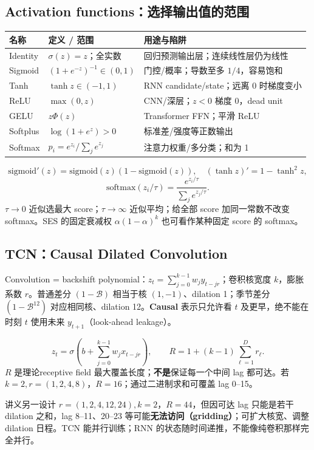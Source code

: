 \documentclass[UTF8,fontset=fandol,10.5pt,a4paper]{ctexart}
\newcommand{\eng}[1]{{\sffamily\color{navy}#1}}
\newcommand{\thick}{\renewcommand{\arraystretch}{1.18}}
\begin{document}
\subsection{Activation functions：选择输出值的范围}
\begin{center}\small\thick\begin{tabularx}{0.99\linewidth}{lXX}
\toprule
名称 & 定义 / 范围 & 用途与陷阱\\\midrule
Identity & $\sigma(z)=z$；全实数 & 回归预测输出层；连续线性层仍为线性 \\
Sigmoid & $(1+e^{-z})^{-1}\in(0,1)$ & 门控/概率；导数至多 $1/4$，容易饱和 \\
Tanh & $\tanh z\in(-1,1)$ & RNN candidate/state；远离 0 时梯度变小 \\
ReLU & $\max(0,z)$ & CNN/深层；$z<0$ 梯度 0，dead unit \\
GELU & $z\Phi(z)$ & Transformer FFN；平滑 ReLU \\
Softplus & $\log(1+e^z)>0$ & 标准差/强度等正数输出 \\
Softmax & $p_i=e^{z_i}/\sum_j e^{z_j}$ & 注意力权重/多分类；和为 1 \\
\bottomrule\end{tabularx}\end{center}
\begin{keybox}
\[\mathrm{sigmoid}'(z)=\mathrm{sigmoid}(z)(1-\mathrm{sigmoid}(z)),\quad (\tanh z)'=1-\tanh^2z,\]
\[\mathrm{softmax}(z_i/\tau)=\frac{e^{z_i/\tau}}{\sum_je^{z_j/\tau}}.\]
$\tau\to0$ 近似选最大 score；$\tau\to\infty$ 近似平均；给全部 score 加同一常数不改变 softmax。SES 的固定衰减权 $\alpha(1-\alpha)^k$ 也可看作某种固定 score 的 softmax。
\end{keybox}
\subsection{TCN：Causal Dilated Convolution}
\eng{Convolution = backshift polynomial}：$z_t=\sum_{j=0}^{k-1}w_jy_{t-jr}$；卷积核宽度 $k$，膨胀系数 $r$。普通差分 $(1-\mathcal B)$ 相当于核 $(1,-1)$、dilation 1；季节差分 $(1-\mathcal B^{12})$ 对应相同核、dilation 12。\textbf{Causal} 表示只允许看 $t$ 及更早，绝不能在时刻 $t$ 使用未来 $y_{t+1}$（\eng{look-ahead leakage}）。
\begin{keybox}
\[z_t=\sigma\left(b+\sum_{j=0}^{k-1}w_jx_{t-jr}\right),\qquad R=1+(k-1)\sum_{\ell=1}^{D}r_\ell.\]
$R$ 是理论\eng{receptive field} 最大覆盖长度；\textbf{不是}保证每一个中间 lag 都可达。若 $k=2,r=(1,2,4,8)$，$R=16$；通过二进制求和可覆盖 lag 0--15。
\end{keybox}
\par\smallskip{}\par\smallskip
讲义另一设计 $r=(1,2,4,12,24),k=2$，$R=44$，但因可达 lag 只能是若干 dilation 之和，lag 8--11、20--23 等可能\textbf{无法访问（gridding）}；可扩大核宽、调整 dilation 日程。TCN 能并行训练；RNN 的状态随时间递推，不能像纯卷积那样完全并行。
\end{document}

